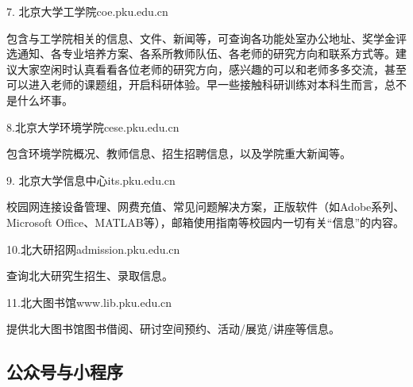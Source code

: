 \documentclass[11pt,oneside]{book}
\begin{document}
\vspace{20pt}

7. 北京大学工学院\quad coe.pku.edu.cn

包含与工学院相关的信息、文件、新闻等，可查询各功能处室办公地址、奖学金评选通知、各专业培养方案、各系所教师队伍、各老师的研究方向和联系方式等。建议大家空闲时认真看看各位老师的研究方向，感兴趣的可以和老师多多交流，甚至可以进入老师的课题组，开启科研体验。早一些接触科研训练对本科生而言，总不是什么坏事。

\vspace{20pt}

8.北京大学环境学院\quad cese.pku.edu.cn

包含环境学院概况、教师信息、招生招聘信息，以及学院重大新闻等。

\vspace{20pt}

9. 北京大学信息中心\quad its.pku.edu.cn

校园网连接设备管理、网费充值、常见问题解决方案，正版软件（如Adobe系列、Microsoft Office、MATLAB等），邮箱使用指南等校园内一切有关“信息”的内容。

\vspace{20pt}

10.北大研招网\quad admission.pku.edu.cn

查询北大研究生招生、录取信息。

\vspace{20pt}

11.北大图书馆\quad www.lib.pku.edu.cn

提供北大图书馆图书借阅、研讨空间预约、活动/展览/讲座等信息。

\newpage

\subsection{公众号与小程序}
\end{document}
